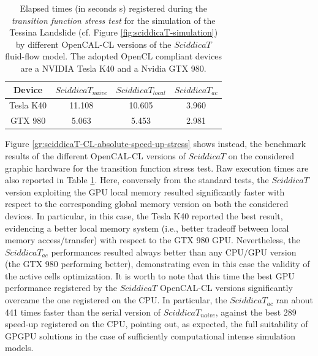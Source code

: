 \begin{table}
	\centering
	\begin{tabular}{cccc}
		\hline Device & $SciddicaT_{naive}$ & $SciddicaT_{local}$ &
		$SciddicaT_{ac}$ \\ \hline Tesla K40 & 11.108 & 10.605 &
		3.960\\ GTX 980 & 5.063 & 5.453 & 2.981\\ \hline
	\end{tabular}
	\caption[Elapsed times (in seconds \si{s}) registered during the \emph{transition
		function stress test} by different OpenCAL-CL
	versions of the $SciddicaT$ fluid-flow model.]{Elapsed times (in seconds \si{s}) registered during the \emph{transition
			function stress test} for the simulation of the Tessina Landslide
		(cf. Figure \ref{fig:sciddicaT-simulation}) by different OpenCAL-CL
		versions of the $SciddicaT$ fluid-flow model. The adopted OpenCL
		compliant devices are a NVIDIA Tesla K40 and a Nvidia GTX 980.}
	\label{tab:sciddicaT-CL-execution-times-stress}
\end{table}
Figure \ref{gr:sciddicaT-CL-absolute-speed-up-stress} shows
instead, the benchmark results of the different OpenCAL-CL versions
of $SciddicaT$ on the considered graphic hardware for the
transition function stress test. Raw execution times are also reported in Table \ref{tab:sciddicaT-CL-execution-times-stress}. Here, conversely from the
standard tests, the $SciddicaT$ version exploiting the GPU local
memory resulted significantly faster with respect to the
corresponding global memory version on both the considered
devices. In particular, in this case, the Tesla K40 reported the
best result, evidencing a better local memory system (i.e., better
tradeoff between local memory access/transfer) with respect to the
GTX 980 GPU. Nevertheless, the $SciddicaT_{ac}$ performances
resulted always better than any CPU/GPU version (the GTX 980
performing better), demonstrating even in this case the validity
of the active cells optimization. It is worth to note that this time
the best GPU performance registered by the $SciddicaT$ OpenCAL-CL
versions significantly overcame the one registered on the CPU. In
particular, the $SciddicaT_{ac}$ ran about 441 times faster than
the serial version of $SciddicaT_{naive}$, against the best 289
speed-up registered on the CPU, pointing out, as expected, the
full suitability of GPGPU solutions in the case of sufficiently
computational intense simulation models.

